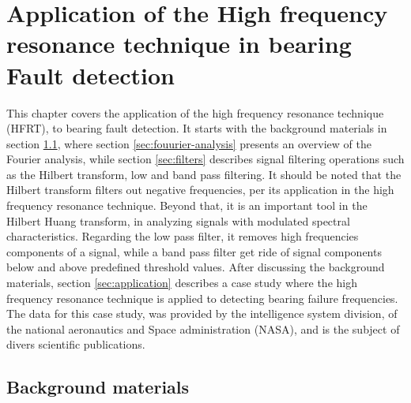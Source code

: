 \documentclass[../Main/thesis.tex]{subfiles}
\begin{document}
\chapter[Application of the High frequency resonance technique in bearing Fault detection]{Application of the High frequency resonance technique in bearing Fault detection}
\label{sec:chapter2}
This chapter covers the application of the high frequency resonance technique (HFRT), to bearing fault detection. It starts with the background materials in section \ref{sec:background-material}, where section \ref{sec:fouurier-analysis} presents an overview of the Fourier analysis, while section \ref{sec:filters} describes signal filtering operations such as the Hilbert transform, low and band pass filtering. 
\justify
It should be noted that the Hilbert transform filters out negative frequencies, per its application in the high frequency resonance technique. Beyond that, it is an important tool in the Hilbert Huang transform, in analyzing signals with modulated spectral characteristics. Regarding the low pass filter, it removes high frequencies components of a signal, while a band pass filter get ride of signal components below and above predefined threshold values.
\justify
After discussing the background materials, section \ref{sec:application} describes a case study where the high frequency resonance technique is applied to detecting bearing failure frequencies. The data for this case study, was provided by the intelligence system division, of the national aeronautics and Space administration (NASA), and is the subject of divers scientific publications.

\section{Background materials}
\label{sec:background-material}
\end{document}
